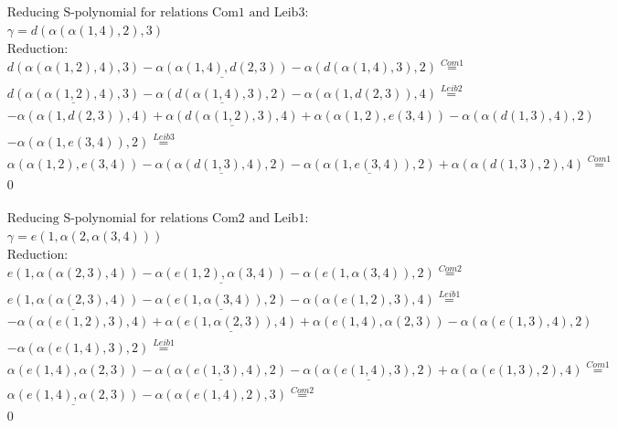 \documentclass[11pt]{amsart}
\begin{document}
\begin{align*} 
& \text{Reducing S-polynomial for relations Com1 and Leib3:} \\ 
& \gamma = d(\alpha(\alpha(1,4),2),3) \\ 
& \text{Reduction}: \\&d(\alpha(\alpha(1,2),4),3) - \underline{\alpha(\alpha(1,4),d(2,3))} - \alpha(d(\alpha(1,4),3),2) \stackrel{ Com1 }{=}  \\ 
&\underline{d(\alpha(\alpha(1,2),4),3)} - \underline{\alpha(d(\alpha(1,4),3),2)} - \alpha(\alpha(1,d(2,3)),4) \stackrel{ Leib2 }{=}  \\ 
& - \alpha(\alpha(1,d(2,3)),4) + \underline{\alpha(d(\alpha(1,2),3),4)} + \alpha(\alpha(1,2),e(3,4)) - \alpha(\alpha(d(1,3),4),2)\\ 
 &  - \alpha(\alpha(1,e(3,4)),2) \stackrel{ Leib3 }{=}  \\ 
&\alpha(\alpha(1,2),e(3,4)) - \underline{\alpha(\alpha(d(1,3),4),2)} - \underline{\alpha(\alpha(1,e(3,4)),2)} + \alpha(\alpha(d(1,3),2),4) \stackrel{ Com1 }{=}  \\ 
&0\\ 
\end{align*} 
 
\begin{align*} 
& \text{Reducing S-polynomial for relations Com2 and Leib1:} \\ 
& \gamma = e(1,\alpha(2,\alpha(3,4))) \\ 
& \text{Reduction}: \\&e(1,\alpha(\alpha(2,3),4)) - \underline{\alpha(e(1,2),\alpha(3,4))} - \alpha(e(1,\alpha(3,4)),2) \stackrel{ Com2 }{=}  \\ 
&\underline{e(1,\alpha(\alpha(2,3),4))} - \underline{\alpha(e(1,\alpha(3,4)),2)} - \alpha(\alpha(e(1,2),3),4) \stackrel{ Leib1 }{=}  \\ 
& - \alpha(\alpha(e(1,2),3),4) + \underline{\alpha(e(1,\alpha(2,3)),4)} + \alpha(e(1,4),\alpha(2,3)) - \alpha(\alpha(e(1,3),4),2)\\ 
 &  - \alpha(\alpha(e(1,4),3),2) \stackrel{ Leib1 }{=}  \\ 
&\alpha(e(1,4),\alpha(2,3)) - \underline{\alpha(\alpha(e(1,3),4),2)} - \underline{\alpha(\alpha(e(1,4),3),2)} + \alpha(\alpha(e(1,3),2),4) \stackrel{ Com1 }{=}  \\ 
&\underline{\alpha(e(1,4),\alpha(2,3))} - \alpha(\alpha(e(1,4),2),3) \stackrel{ Com2 }{=}  \\ 
&0\\ 
\end{align*} 
 
\end{document}
